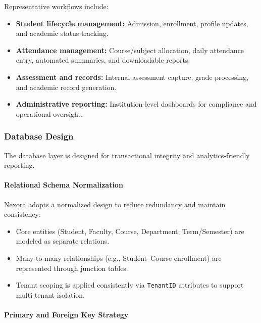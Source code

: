 \documentclass[11pt]{article}
\providecommand{\tightlist}{%
  \setlength{\itemsep}{0pt}\setlength{\parskip}{0pt}}
\begin{document}
Representative workflows include:

\begin{itemize}
\tightlist
\item
  \textbf{Student lifecycle management:} Admission, enrollment, profile
  updates, and academic status tracking.
\item
  \textbf{Attendance management:} Course/subject allocation, daily
  attendance entry, automated summaries, and downloadable reports.
\item
  \textbf{Assessment and records:} Internal assessment capture, grade
  processing, and academic record generation.
\item
  \textbf{Administrative reporting:} Institution-level dashboards for
  compliance and operational oversight.
\end{itemize}

\subsubsection{Database Design}\label{database-design}

The database layer is designed for transactional integrity and
analytics-friendly reporting.

\paragraph{Relational Schema
Normalization}\label{relational-schema-normalization}

Nexora adopts a normalized design to reduce redundancy and maintain
consistency:

\begin{itemize}
\tightlist
\item
  Core entities (Student, Faculty, Course, Department, Term/Semester)
  are modeled as separate relations.
\item
  Many-to-many relationships (e.g., Student--Course enrollment) are
  represented through junction tables.
\item
  Tenant scoping is applied consistently via \texttt{TenantID}
  attributes to support multi-tenant isolation.
\end{itemize}

\paragraph{Primary and Foreign Key
Strategy}\label{primary-and-foreign-key-strategy}
\end{document}
